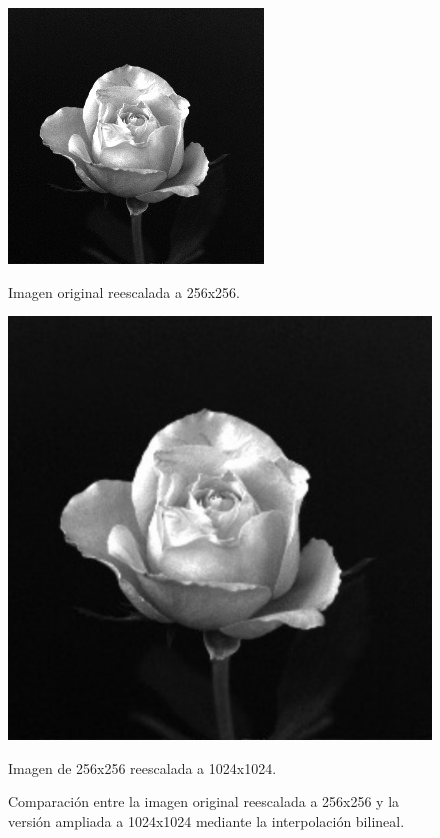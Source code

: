 \documentclass[11pt, letterpaper]{article}
\begin{document}
	\begin{figure}[h]
		\centering
		\begin{minipage}{0.45\textwidth}
			\centering
			\includegraphics[width=\textwidth]{IMG/b1.jpg}
			\caption{Imagen original reescalada a 256x256.}
			\label{fig:b1}
		\end{minipage}
		\hfill
		\begin{minipage}{0.45\textwidth}
			\centering
			\includegraphics[width=\textwidth]{IMG/b2.jpg}
			\caption{Imagen de 256x256 reescalada a 1024x1024.}
			\label{fig:b2}
		\end{minipage}
		\caption{Comparación entre la imagen original reescalada a 256x256 y la versión ampliada a 1024x1024 mediante la interpolación bilineal.}
		\label{fig:comparacion}
	\end{figure}
\end{document}
